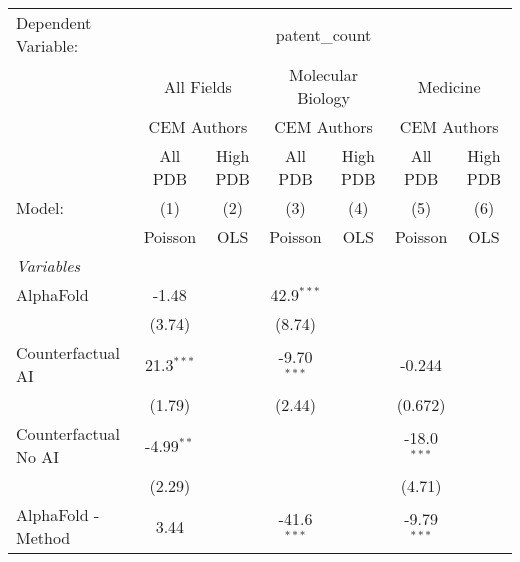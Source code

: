\begingroup
\centering
\begin{tabular}{lcccccc}
   \tabularnewline \midrule \midrule
   Dependent Variable: & \multicolumn{6}{c}{patent\_count}\\
 & \multicolumn{2}{c}{All Fields} & \multicolumn{2}{c}{Molecular Biology} & \multicolumn{2}{c}{Medicine} \\
\cmidrule(lr){2-3} \cmidrule(lr){4-5} \cmidrule(lr){6-7}
 & \multicolumn{2}{c}{CEM Authors} & \multicolumn{2}{c}{CEM Authors} & \multicolumn{2}{c}{CEM Authors} \\
\cmidrule(lr){2-3} \cmidrule(lr){4-5} \cmidrule(lr){6-7}
 & \multicolumn{1}{c}{All PDB} & \multicolumn{1}{c}{High PDB} & \multicolumn{1}{c}{All PDB} & \multicolumn{1}{c}{High PDB} & \multicolumn{1}{c}{All PDB} & \multicolumn{1}{c}{High PDB} \\
\cmidrule(lr){2-2} \cmidrule(lr){3-3} \cmidrule(lr){4-4} \cmidrule(lr){5-5} \cmidrule(lr){6-6} \cmidrule(lr){7-7}
   Model:                                                     & (1)           & (2)  & (3)           & (4)  & (5)           & (6)\\  
                                                              &  Poisson      & OLS  & Poisson       & OLS  & Poisson       & OLS\\  
   \midrule
   \emph{Variables}\\
   AlphaFold                                                  & -1.48         &      & 42.9$^{***}$  &      &               &   \\   
                                                              & (3.74)        &      & (8.74)        &      &               &   \\   
   Counterfactual AI                                          & 21.3$^{***}$  &      & -9.70$^{***}$ &      & -0.244        &   \\   
                                                              & (1.79)        &      & (2.44)        &      & (0.672)       &   \\   
   Counterfactual No AI                                       & -4.99$^{**}$  &      &               &      & -18.0$^{***}$ &   \\   
                                                              & (2.29)        &      &               &      & (4.71)        &   \\   
   AlphaFold - Method                                         & 3.44          &      & -41.6$^{***}$ &      & -9.79$^{***}$ &   \\   

\end{tabular}
